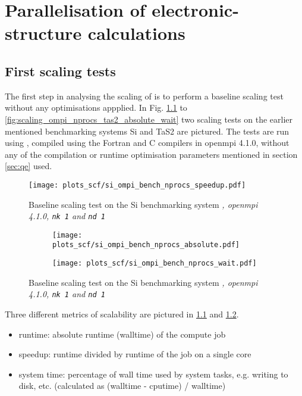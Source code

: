 \documentclass[main.tex]{subfiles}
\begin{document}
\chapter{Parallelisation of electronic-structure calculations\label{ch:optimisation_scf}}


\section{First scaling tests}

The first step in analysing the scaling of \QE is to perform a baseline scaling test without any optimisations appplied. 
In Fig. \ref{fig:scaling_ompi_nprocs_si_speedup} to \ref{fig:scaling_ompi_nprocs_tas2_absolute_wait} two scaling tests on the earlier mentioned benchmarking systems Si and TaS2 are pictured. 
The tests are run using , compiled using the Fortran and C compilers in \gls{openmpi} 4.1.0, without any of the compilation or runtime optimisation parameters mentioned in section \ref{sec:qe} used.

\begin{figure}[ht!]
\centering
\texttt{[image: plots\_scf/si\_ompi\_bench\_nprocs\_speedup.pdf]}
\caption{Baseline scaling test on the Si benchmarking system \emph{, \gls{openmpi} 4.1.0, \texttt{nk 1} and \texttt{nd 1}}}
\label{fig:scaling_ompi_nprocs_si_speedup}
\end{figure}

\begin{figure}[ht!]
\begin{subfigure}[b]{0.49\textwidth}
    \centering
    \texttt{[image: plots\_scf/si\_ompi\_bench\_nprocs\_absolute.pdf]}
\end{subfigure}
\begin{subfigure}[b]{0.49\textwidth}
    \centering
    \texttt{[image: plots\_scf/si\_ompi\_bench\_nprocs\_wait.pdf]}
\end{subfigure}
\caption{Baseline scaling test on the Si benchmarking system \emph{, \gls{openmpi} 4.1.0, \texttt{nk 1} and \texttt{nd 1}}}
\label{fig:scaling_ompi_nprocs_si_absolute_wait}
\end{figure}

Three different metrics of scalability are pictured in \ref{fig:scaling_ompi_nprocs_si_speedup} and \ref{fig:scaling_ompi_nprocs_si_absolute_wait}. 
\begin{itemize}
    \item runtime: absolute runtime (walltime) of the compute job
    \item speedup: runtime divided by runtime of the job on a single core
    \item system time: percentage of wall time used by system tasks, e.g. writing to disk, etc. (calculated as (walltime - cputime) / walltime)
\end{itemize}
\end{document}
